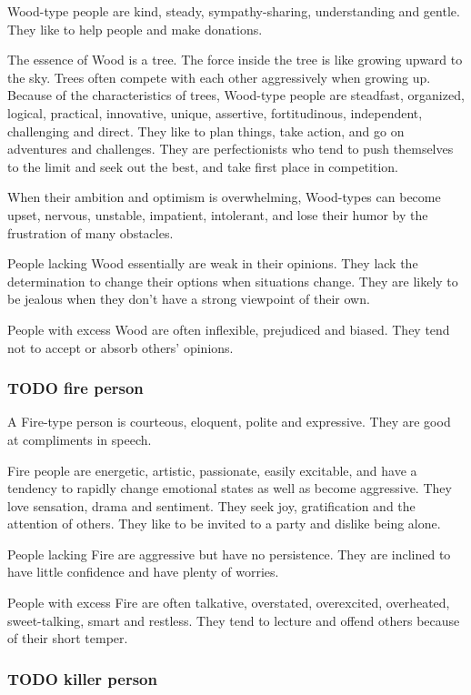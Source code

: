 \documentclass[11pt]{article}
\begin{document}
Wood-type people are kind, steady, sympathy-sharing, understanding
and gentle. They like to help people and make donations.

The essence of Wood is a tree. The force inside the tree is like
growing upward to the sky. Trees often compete with each other
aggressively when growing up. Because of the characteristics of
trees, Wood-type people are steadfast, organized, logical, practical,
innovative, unique, assertive, fortitudinous, independent,
challenging and direct. They like to plan things, take action, and go
on adventures and challenges. They are perfectionists who tend to
push themselves to the limit and seek out the best, and take first
place in competition.

When their ambition and optimism is overwhelming, Wood-types can
become upset, nervous, unstable, impatient, intolerant, and lose
their humor by the frustration of many obstacles.

People lacking Wood essentially are weak in their opinions. They lack
the determination to change their options when situations
change. They are likely to be jealous when they don't have a strong
viewpoint of their own.

People with excess Wood are often inflexible, prejudiced and
biased. They tend not to accept or absorb others' opinions.
\subsubsection{{\bfseries\sffamily TODO} fire person}
\label{sec-2-2-7}



A Fire-type person is courteous, eloquent, polite and
expressive. They are good at compliments in speech.

Fire people are energetic, artistic, passionate, easily excitable,
and have a tendency to rapidly change emotional states as well as
become aggressive. They love sensation, drama and sentiment. They
seek joy, gratification and the attention of others. They like to be
invited to a party and dislike being alone.

People lacking Fire are aggressive but have no persistence. They are
inclined to have little confidence and have plenty of worries.

People with excess Fire are often talkative, overstated, overexcited,
overheated, sweet-talking, smart and restless. They tend to lecture
and offend others because of their short temper. 

\subsubsection{{\bfseries\sffamily TODO} killer person}
\label{sec-2-2-8}
\end{document}
